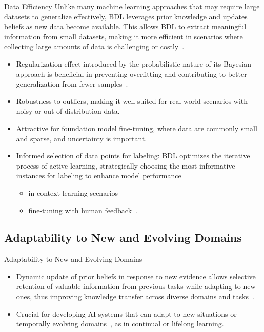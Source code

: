 \documentclass[9pt]{beamer}
\begin{document}
\begin{frame}{Data Efficiency}
Unlike many machine learning approaches that may require large datasets to generalize effectively, BDL leverages \alert{prior knowledge} and updates beliefs as new data become available. This allows BDL to extract meaningful information from \alert{small datasets}, making it more efficient in scenarios where \alert{collecting large amounts of data is challenging or costly}~\citep{finzi2021residual,immer2022invariance,shwartz2022,schwobel2022last,van2023learning}.

\begin{itemize}[<+->]
	\item \alert{Regularization} effect introduced by the probabilistic nature of its Bayesian approach is beneficial in \alert{preventing overfitting} and contributing to better \alert{generalization} from fewer samples~\citep{rothfuss2022pac, sharma2023incorporating}.
	\item \alert{Robustness to outliers}, making it well-suited for real-world scenarios with noisy or out-of-distribution data. 
	\item Attractive for \alert{foundation model fine-tuning}, where data are commonly small and sparse, and uncertainty is important.
	\item Informed selection of data points for labeling: BDL optimizes the iterative process of \alert{active learning}, strategically choosing the most informative instances for labeling to enhance model performance~\citep{galAL2017}
	\begin{itemize}
		\item in-context learning scenarios~\citep{margatina-etal-2023-active} 
		\item fine-tuning with human feedback~\citep{casper2023open}.	
	\end{itemize}
\end{itemize}
\end{frame} 

\subsection{Adaptability to New and Evolving Domains}

\begin{frame}{Adaptability to New and Evolving Domains}
\begin{itemize}[<+->]
	\item \alert{Dynamic update of prior beliefs} in response to new evidence allows selective retention of valuable information from previous tasks while adapting to new ones, thus improving \alert{knowledge transfer} across diverse domains and tasks~\citep{rothfuss2021pacoh,rothfuss2022pac,rudner2023uap}. 
	\item Crucial for developing AI systems that can adapt to new situations or temporally evolving domains~\citep{nguyen2018variational,rudner2022sfsvi}, as in \alert{continual or lifelong learning}. 
\end{itemize}
\end{frame}
\end{document}
